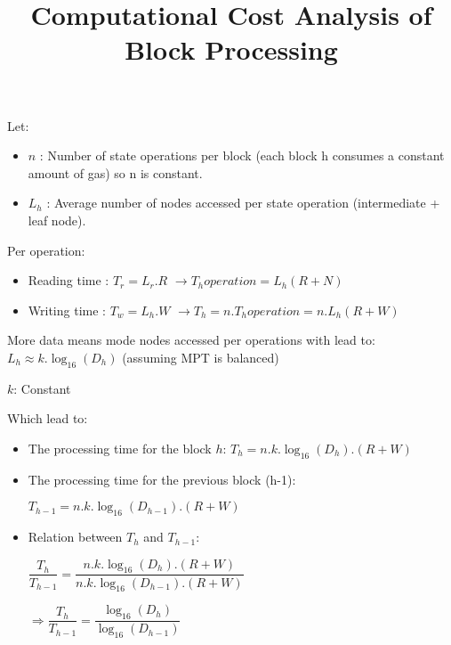 \documentclass{article}
\title{Computational Cost Analysis of Block Processing}
\date{}
\begin{document}
\maketitle

Let:
\begin{itemize}
    \item ${n}$ : Number of state operations per block (each block h consumes a constant amount of gas) so n is constant.
    \item ${L_h}$ : Average number of nodes accessed per state operation (intermediate + leaf node).
\end{itemize}

Per operation:
\begin{itemize}
    \item Reading time : ${T_r = L_r . R}$ $\rightarrow{}$${T_hoperation = L_h(R+N)}$
    \item Writing time :  ${T_w = L_h . W}$ $\rightarrow{}$${T_h = n.T_hoperation = n.L_h(R+W)}$
\end{itemize}

More data means mode nodes accessed per operations with lead to:
${L_h \approx k .\log_{16} (D_h)}$ (assuming MPT is balanced)

${k}$: Constant

Which lead to:

\centering{}

\begin{itemize}
    \item The processing time for the block ${h}$: ${T_h = n.k.\log_{16}(D_h) . (R + W)}$

    \item The processing time for the previous block (h-1):


          ${T_{h-1} = n.k.\log_{16}(D_{h-1}) . (R + W)}$

    \item Relation between $T_h$ and $T_{h-1}$:

          $\dfrac{T_h}{T_{h-1}} = \dfrac{n.k.\log_{16}(D_h) . (R + W)}{n.k.\log_{16}(D_{h-1}) . (R + W)}$

          $\Rightarrow \dfrac{T_h}{T_{h-1}} = \dfrac{\log_{16}(D_h) }{\log_{16}(D_{h-1}) }$

          \centering{}


\end{itemize}
\end{document}
